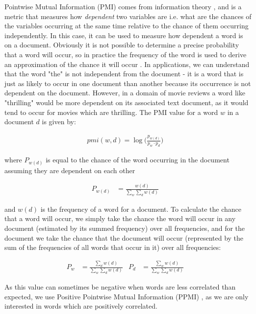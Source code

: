 Pointwise Mutual Information (PMI) comes from  information theory \cite{fano1961transmission}, and is a metric that measures how \textit{dependent}  two variables are i.e. what are the chances of the variables occurring  at the same time  relative to the chance of them occurring independently. In this case, it can be used to measure how dependent a word is on a document. Obviously it is not possible to determine a precise probability that a word will occur, so in practice the frequency of the word is used to derive an approximation of the chance it will occur \cite{Church1989}. In applications, we can understand that the word "the" is not independent from the document - it is a word that is just as likely to occur in one document than another because its occurrence is not dependent on the document. However, in a domain of movie reviews a word like "thrilling" would be more dependent on its associated text document, as it would tend to occur for movies which are thrilling. The PMI value for a word $w$ in a document  $d$ is given by:

\begin{align*}
\textit{pmi}(w, d) = \log\big(\frac{p_{{w}(d)}}{p_{w} \cdotp p_{d}}\big) &
\end{align*}

where $P_{{w}(d)}$ is equal to the chance of the word occurring in the document assuming they are dependent on each other 

\begin{align*}
P_{{w}(d)} &= \frac{{w}(d)}{\sum_{w} \sum_{d} {w}(d)} &
\end{align*}

and ${w}(d)$ is the frequency of a word for a document. To calculate the chance that a word will occur, we simply take the chance the word will occur in any document (estimated by its summed frequency) over all frequencies, and for the document we take the chance that the document  will occur (represented by the sum of the  frequencies of all words that occur in it) over all frequencies:

\begin{align*}
P_{w} &= \frac{\sum_{d} {w}(d)}{\sum_{w} \sum_{d} {w}(d)} &
P_{d} &= \frac{\sum_{w} {w}(d)}{\sum_{w} \sum_{d} {w}(d)} &
\end{align*}



As this value can sometimes be negative when words are less correlated than expected, we use Positive Pointwise Mutual Information  (PPMI) \cite{Klabunde2002}, as we are only interested in words which are positively correlated.


